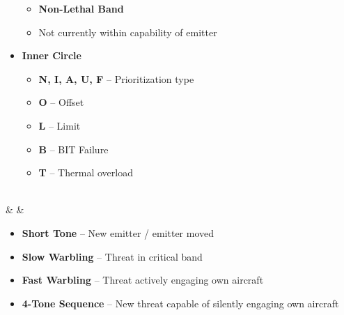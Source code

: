 \documentclass[fontInter]{TechCheck}
\begin{document}
\begin{listlongtable}
\begin{minipage}[t]{\linewidth}
\begin{itemize}
\begin{itemize}
					\item \textbf{Non-Lethal Band}
					\item Not currently within capability of emitter
				\end{itemize}
				\item \textbf{Inner Circle}
				\begin{itemize}
					\item \textbf{N, I, A, U, F} -- Prioritization type
					\item \textbf{O} -- Offset
					\item \textbf{L} -- Limit
					\item \textbf{B} -- BIT Failure
					\item \textbf{T} -- Thermal overload
				\end{itemize}
			\end{itemize}
		\end{minipage} \\
		\midrule
		\textbf{\textbullet} &  &
		\begin{minipage}[t]{\linewidth}
			\vspace{-7pt}
			\begin{itemize}
				\item \textbf{Short Tone} -- New emitter / emitter moved
				\item \textbf{Slow Warbling} -- Threat in critical band
				\item \textbf{Fast Warbling} -- Threat actively engaging own aircraft
				\item \textbf{4-Tone Sequence} -- New threat capable of silently engaging own aircraft
			\end{itemize}
		\end{minipage} \\
	\end{listlongtable}

	\clearpage
\end{document}
